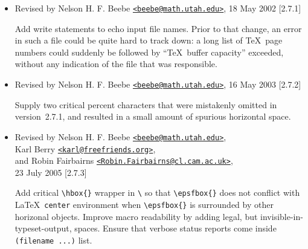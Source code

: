 \documentclass[DIV=9, pagesize=auto]{scrartcl}
\makeatletter
\newcommand*{\Mail}[1]{\href{mailto:#1}{\texttt{<#1>}}}
\newcommand*{\cs}[1]{\texttt{\textbackslash#1}}
\newcommand*{\cmd}[1]{\cs{\expandafter\@gobble\string#1}}
\newcommand*{\env}[1]{\texttt{#1}}
\newcommand*{\Beebe}{Nelson H. F. Beebe \Mail{beebe@math.utah.edu}\xspace}
\makeatother
\begin{document}
\begin{itemize}
\item Revised by \Beebe, 18 May 2002 [2.7.1]
  
  Add write statements to echo input file
  names.  Prior to that change, an error in
  such a file could be quite hard to track
  down: a long list of \TeX\ page numbers could
  suddenly be followed by ``\TeX\ buffer
  capacity'' exceeded, without any indication
  of the file that was responsible.

\item Revised by \Beebe, 16 May 2003 [2.7.2]
  
  Supply two critical percent characters that
  were mistakenly omitted in version~2.7.1,
  and resulted in a small amount of spurious
  horizontal space.

\item Revised by \Beebe,\\ Karl Berry
  \Mail{karl@freefriends.org},\\ and Robin Fairbairns
  \Mail{Robin.Fairbairns@cl.cam.ac.uk},\\
  23 July 2005 [2.7.3]

  Add critical \verb+\hbox{}+ wrapper in \cmd{\epsfsetgraph}
  so that \verb+\epsfbox{}+ does not conflict with
  \LaTeX\ \env{center} environment when \verb+\epsfbox{}+ is
  surrounded by other horizonal objects.
  Improve macro readability by adding legal,
  but invisible-in-typeset-output, spaces.
  Ensure that verbose status reports come
  inside \verb+(filename ...)+ list.

\end{itemize}
\end{document}
